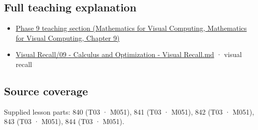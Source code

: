 \subsection{Full teaching explanation}\label{appendix-8f96f9c4d5bc-full-teaching-explanation}

\begin{itemize}
\tightlist
\item
  \href{../02-Mathematics-for-Visual-Computing/main.pdf\#nameddest=02-foundations-ii-ch025-odes-and-numerical-simulation}{Phase 9 teaching section (Mathematics for Visual Computing, Mathematics for Visual Computing, Chapter 9)}
\item
  \hyperref[appendix-adf48f5dc5c1]{Visual Recall/09 - Calculus and Optimization - Visual Recall.md} · visual recall
\end{itemize}

\subsection{Source coverage}\label{appendix-8f96f9c4d5bc-source-coverage}

Supplied lesson parts: 840 (T03 · M051), 841 (T03 · M051), 842 (T03 · M051), 843 (T03 · M051), 844 (T03 · M051).
